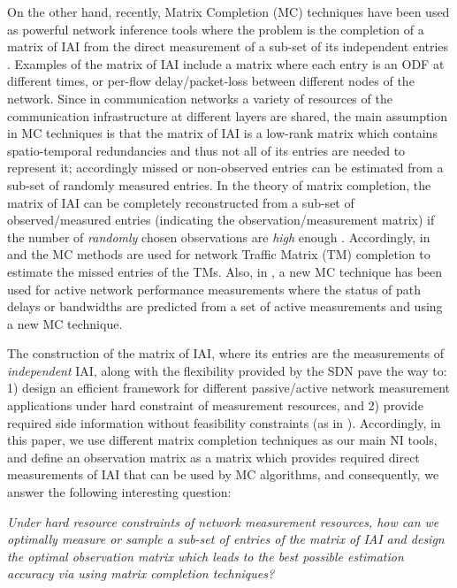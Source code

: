 On the other hand, recently, Matrix Completion (MC) techniques have been used as powerful network inference tools where the problem is the completion of a matrix of IAI from the direct measurement of a sub-set of its independent entries \cite{Roughan:2012}\cite{Gursun:2011}\cite{YLiao:2011}. Examples of the matrix of IAI include a matrix where each entry is an ODF at different times, or per-flow delay/packet-loss between different nodes of the network. Since in communication networks a variety of resources of the communication infrastructure at different layers are shared, the main assumption in MC techniques is that the matrix of IAI is a low-rank matrix which contains spatio-temporal redundancies and thus not all of its entries are needed to represent it; accordingly missed or non-observed entries can be estimated from a sub-set of randomly measured entries. In the theory of matrix completion, the matrix of IAI can be completely reconstructed from a sub-set of observed/measured entries (indicating the observation/measurement matrix) if the number of \emph{randomly} chosen observations are \emph{high} enough \cite{Candes:2009}\cite{Candes:2010}. Accordingly, in \cite{Roughan:2012} and \cite{Gursun:2011} the MC methods are used for network Traffic Matrix (TM) completion to estimate the missed entries of the TMs. Also, in \cite{YLiao:2011}, a new MC technique has been used for active network performance measurements where the status of path delays or bandwidths are predicted from a set of active measurements and using a new MC technique.

The construction of the matrix of IAI, where its entries are the measurements of \emph{independent} IAI, along with the flexibility provided by the SDN pave the way to: 1) design an efficient framework for different passive/active network measurement applications under hard constraint of measurement resources, and 2) provide required side information without feasibility constraints (as in \cite{IF14iSTAMP:2014}). Accordingly, in this paper, we use different matrix completion techniques as our main NI tools, and define an observation matrix as a matrix which provides required direct measurements of IAI that can be used by MC algorithms, and consequently, we answer the following interesting question:

\emph{Under hard resource constraints of network measurement resources, how can we optimally measure or sample a sub-set of entries of the matrix of IAI and design the optimal observation matrix which leads to the best possible estimation accuracy via using matrix completion techniques?}

